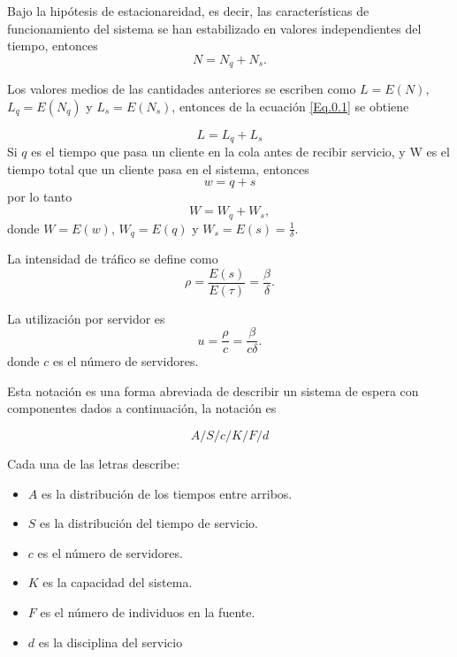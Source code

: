 Bajo la hip\'otesis de estacionareidad, es decir, las caracter\'isticas de funcionamiento del sistema se han estabilizado en valores independientes del tiempo, entonces
\begin{equation}
N=N_{q}+N_{s}.
\end{equation}

Los valores medios de las cantidades anteriores se escriben como $L=E\left(N\right)$, $L_{q}=E\left(N_{q}\right)$ y $L_{s}=E\left(N_{s}\right)$, entonces de la ecuaci\'on \ref{Eq.0.1} se obtiene

\begin{equation}
L=L_{q}+L_{s}
\end{equation}
Si $q$ es el tiempo que pasa un cliente en la cola antes de recibir servicio, y W es el tiempo total que un cliente pasa en el sistema, entonces \[w=q+s\] por lo tanto \[W=W_{q}+W_{s},\] donde $W=E\left(w\right)$, $W_{q}=E\left(q\right)$ y $W_{s}=E\left(s\right)=\frac{1}{\delta}$.

La intensidad de tr\'afico se define como
\begin{equation}
\rho=\frac{E\left(s\right)}{E\left(\tau\right)}=\frac{\beta}{\delta}.
\end{equation}

La utilizaci\'on por servidor es
\begin{equation}
u=\frac{\rho}{c}=\frac{\beta}{c\delta}.
\end{equation}
donde $c$ es el n\'umero de servidores.

Esta notaci\'on es una forma abreviada de describir un sistema de espera con componentes dados a continuaci\'on, la notaci\'on es

\begin{equation}\label{Notacion.K.L.}
A/S/c/K/F/d
\end{equation}

Cada una de las letras describe:

\begin{itemize}
\item $A$ es la distribuci\'on de los tiempos entre arribos.
\item $S$ es la distribuci\'on del tiempo de servicio.
\item $c$ es el n\'umero de servidores.
\item $K$ es la capacidad del sistema.
\item $F$ es el n\'umero de individuos en la fuente.
\item $d$ es la disciplina del servicio
\end{itemize}

